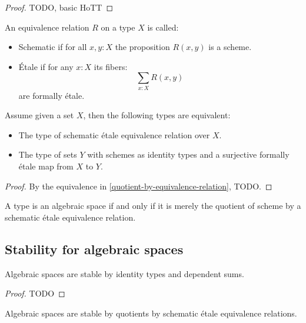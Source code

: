 \begin{proof}
TODO, basic HoTT
\end{proof}

\begin{definition}
An equivalence relation $R$ on a type $X$ is called:
\begin{itemize}
\item Schematic if for all $x,y:X$ the proposition $R(x,y)$ is a scheme.
\item Étale if for any $x:X$ its fibers:
\[\sum_{x:X} R(x,y)\]
are formally étale.
\end{itemize}
\end{definition}

\begin{proposition}
Assume given a set $X$, then the following types are equivalent:
\begin{itemize}
\item The type of schematic étale equivalence relation over $X$.
\item The type of sets $Y$ with schemes as identity types and a surjective formally étale map from $X$ to $Y$.
\end{itemize}
\end{proposition}

\begin{proof}
By the equivalence in \cref{quotient-by-equivalence-relation}, TODO.
\end{proof}

\begin{corollary}
A type is an algebraic space if and only if it is merely the quotient of scheme by a schematic étale equivalence relation.
\end{corollary}

\subsection{Stability for algebraic spaces}

\begin{lemma}
Algebraic spaces are stable by identity types and dependent sums.
\end{lemma}

\begin{proof}
TODO
\end{proof}

\begin{lemma}
Algebraic spaces are stable by quotients by schematic étale equivalence relations.
\end{lemma}

